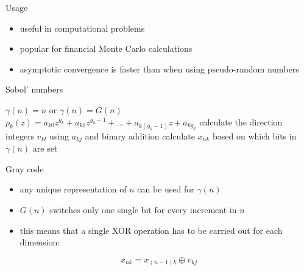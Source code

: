 \documentclass[11pt]{beamer}
\begin{document}
\begin{frame}{Usage}
    \begin{itemize}[--]
        \item useful in computational problems
        \medskip
        \item popular for financial Monte Carlo calculations 
        \medskip
        \item asymptotic convergence is faster than when using pseudo-random numbers

    \end{itemize}
\end{frame}

\begin{frame}{Sobol' numbers}
    \begin{algorithm}[H]
        \caption{Generates the $d$-dimensional vector $x_n$ in the Sobol sequence.}\label{alg:alg1}
        \begin{algorithmic}[1]
            \State $\gamma(n) = n$ or $\gamma(n) = G(n)$
            \State $p_k(z) = a_{k0} z^{g_k} + a_{k1} z^{g_k-1} + \ldots + a_{k (g_k-1)} z + a_{k g_k}$
            \State calculate the direction integers $v_{kl}$ using $a_{kj}$ and binary addition
            \State calculate $x_{nk}$ based on which bits in $\gamma(n)$ are set
            \EndFor
        \end{algorithmic}
        \label{alg_1}
    \end{algorithm}
\end{frame}

\begin{frame}{Gray code}
    \begin{itemize}[--]
        \item any unique representation of $n$ can be used for $\gamma(n)$
        \medskip
        
        \item $G(n)$ switches only one single bit for every increment in $n$
        \medskip
        
        \item this means that a single XOR operation has to be carried out for each dimension: 
    \end{itemize}
    \[ x_{nk} = x_{(n-1)k} \oplus v_{kj} \]

\end{frame}
\end{document}
